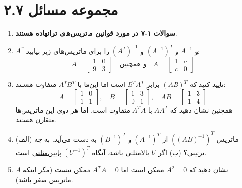 \documentclass[12pt, a4paper]{book}
\begin{document}
	\section*{مجموعه مسائل ۲.۷}
	\begin{enumerate}
		\item[] \textbf{سوالات ۱-۷ در مورد قوانین ماتریس‌های ترانهاده هستند.}
		\item $A^T$ و $A^{-1}$ و $(A^{-1})^T$ و $(A^T)^{-1}$ را برای ماتریس‌های زیر بیابید:
		\[ A = \begin{bmatrix} 1 & 0 \\ 9 & 3 \end{bmatrix} \quad \text{و همچنین} \quad A = \begin{bmatrix} 1 & c \\ c & 0 \end{bmatrix} \]
		
		\item تأیید کنید که $(AB)^T$ برابر $B^TA^T$ است اما این‌ها با $A^TB^T$ متفاوت هستند:
		\[ A = \begin{bmatrix} 1 & 0 \\ 1 & 1 \end{bmatrix}, \quad B = \begin{bmatrix} 1 & 3 \\ 0 & 1 \end{bmatrix}, \quad AB = \begin{bmatrix} 1 & 3 \\ 1 & 4 \end{bmatrix} \]
		همچنین نشان دهید که $AA^T$ با $A^TA$ متفاوت است. اما هر دوی این ماتریس‌ها \underline{متقارن} هستند.
		
		\item (الف) ماتریس $((AB)^{-1})^T$ از $(A^{-1})^T$ و $(B^{-1})^T$ به دست می‌آید. به چه ترتیبی؟
		(ب) اگر $U$ بالامثلثی باشد، آنگاه $(U^{-1})^T$ \underline{پایین‌مثلثی} است.
		
		\item نشان دهید که $A^2=0$ ممکن است اما $A^TA=0$ ممکن نیست (مگر اینکه $A$ ماتریس صفر باشد).
		

\end{enumerate}
\end{document}
